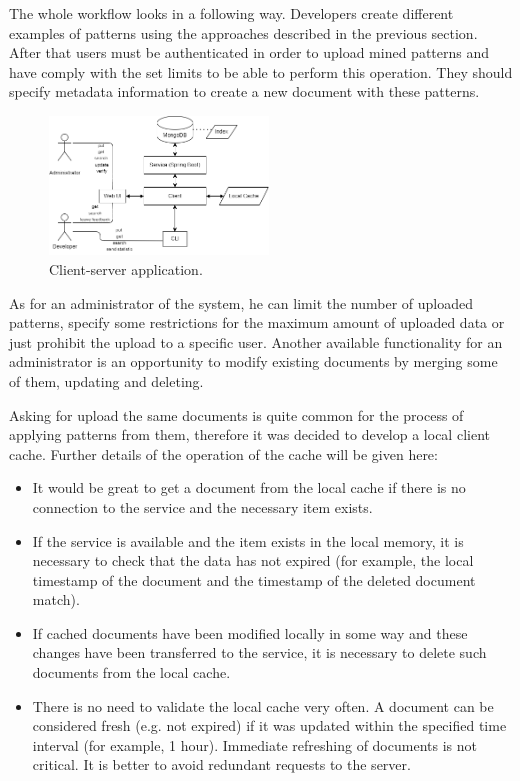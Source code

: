 \documentclass[letterpaper, 10 pt, conference]{ieeeconf}  %
\begin{document}
The whole workflow looks in a following way. Developers create
different examples of patterns using the approaches described in the
previous section. After that users must be authenticated in order
to upload mined patterns and have comply with the set limits to be
able to perform this operation. They should specify metadata
information to create a new document with these patterns. 

\begin{figure}[hbtp]
    \centerline{\includegraphics[width=0.52\textwidth]{arch}}
    \caption{Client-server application.}
    \label{fig:architecture}
\end{figure}

As for an administrator of the system, he can limit the number of
uploaded patterns, specify some restrictions for the maximum amount of
uploaded data or just prohibit the upload to a specific user. Another
available functionality for an administrator is an opportunity to
modify existing documents by merging some of them, updating and
deleting.

Asking for upload the same documents is quite common for the process
of applying patterns from them, therefore it was decided to develop a
local client cache. Further details of the operation of the cache will
be given here:
\begin{itemize}
    \item It would be great to get a document from the
local cache if there is no connection to the service and the necessary
item exists.
    \item If the service is available and the item exists in the
local memory, it is necessary to check that the data has not expired
(for example, the local timestamp of the document and the timestamp of
the deleted document match).
    \item If cached documents have been modified locally in some way
and these changes have been transferred to the service, it is
necessary to delete such documents from the local cache.
    \item There is no need to validate the local cache very often. A
document can be considered fresh (e.g. not expired) if it was
updated within the specified time interval (for example, 1 hour).
Immediate refreshing of documents is not critical. It is better to
avoid redundant requests to the server.
\end{itemize}
\end{document}
